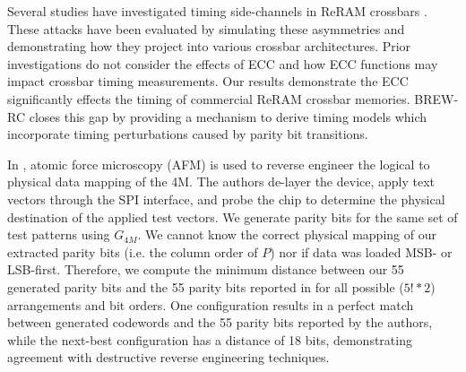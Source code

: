 \label{sec:prior}

Several studies have investigated timing side-channels in ReRAM crossbars \cite{kommareddy2019crossbar, khan2021comprehensive, krautter2022data, wang2023side}. These attacks have been evaluated by simulating these asymmetries and demonstrating how they project into various crossbar architectures. Prior investigations do not consider the effects of ECC and how ECC functions may impact crossbar timing measurements. Our results demonstrate the ECC significantly effects the timing of commercial ReRAM crossbar memories. BREW-RC closes this gap by providing a mechanism to derive timing models which incorporate timing perturbations caused by parity bit transitions.


In \cite{tay2023investigation}, atomic force microscopy (AFM) is used to reverse engineer the logical to physical data mapping of the 4M. 
The authors de-layer the device, apply text vectors through the SPI interface, and probe the chip to determine the physical destination of the applied test vectors. 
We generate parity bits for the same set of test patterns using $G_{4M}$. We cannot know the correct physical mapping of our extracted parity bits (i.e. the column order of $P$) nor if data was loaded MSB- or LSB-first. Therefore, we compute the minimum distance between our 55 generated parity bits and the 55 parity bits reported in \cite{tay2023investigation} for all possible ($5! * 2$) arrangements and bit orders. 
% 
One configuration results in a perfect match between generated codewords and the 55 parity bits reported by the authors, while the next-best configuration has a distance of 18 bits, demonstrating agreement with destructive reverse engineering techniques.

